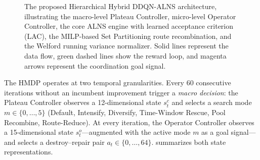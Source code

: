 \documentclass[journal]{IEEEtran}
\begin{document}
\begin{figure}[!t]
{%
}
\caption{The proposed Hierarchical Hybrid DDQN-ALNS architecture, illustrating the macro-level Plateau Controller, micro-level Operator Controller, the core ALNS engine with learned acceptance criterion (LAC), the MILP-based Set Partitioning route recombination, and the Welford running variance normalizer. Solid lines represent the data flow, green dashed lines show the reward loop, and magenta arrows represent the coordination goal signal.}
\label{fig:hybrid_architecture}
\end{figure}

The HMDP operates at two temporal granularities.  Every $60$ consecutive
iterations without an incumbent improvement trigger a \emph{macro decision}:
the Plateau Controller observes a 12-dimensional state $s_t^c$ and selects a
search mode $m\in\{0,\dots,5\}$ (Default, Intensify, Diversify, Time-Window
Rescue, Pool Recombine, Route-Reduce).  At every iteration, the Operator
Controller observes a 15-dimensional state $s_t^o$---augmented with the active
mode $m$ as a goal signal---and selects a destroy--repair pair
$a_t\in\{0,\dots,64\}$.   summarizes both state
representations.
\end{document}
